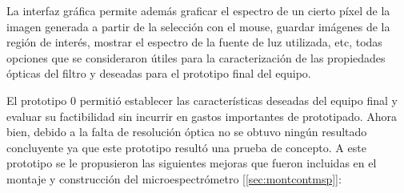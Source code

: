 La interfaz gráfica permite además graficar el espectro de un cierto píxel de la imagen generada a partir de la selección con el mouse, guardar imágenes de la región de interés, mostrar el espectro de la fuente de luz utilizada, etc, todas opciones que se consideraron útiles para la caracterización de las propiedades ópticas del filtro y deseadas para el prototipo final del equipo.

El prototipo 0 permitió establecer las características deseadas del equipo final y evaluar su factibilidad sin incurrir en gastos importantes de prototipado. Ahora bien, debido a la falta de resolución óptica no se obtuvo ningún resultado concluyente ya que este prototipo resultó una prueba de concepto. A este prototipo se le propusieron las siguientes mejoras que fueron incluidas en el montaje y construcción del microespectrómetro [\ref{sec:montcontmsp}]:

